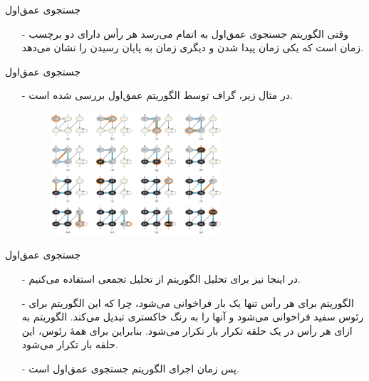 \begin{frame}{‌جستجوی عمق‌اول}
\begin{itemize}\itemr
\item[-]
وقتی الگوریتم جستجوی عمق‌اول به اتمام می‌رسد هر رأس دارای دو برچسب زمان است که یکی زمان پیدا شدن
و دیگری زمان به پایان رسیدن
را نشان می‌دهد.
\end{itemize}
\end{frame}


\begin{frame}{‌جستجوی عمق‌اول}
\begin{itemize}\itemr
\item[-]
در مثال زیر، گراف توسط الگوریتم عمق‌اول بررسی شده است.
\begin{figure}
\includegraphics[width=0.6\textwidth]{figs/chap07/566-dfs}
\end{figure}
\end{itemize}
\end{frame}


\begin{frame}{‌جستجوی عمق‌اول}
\begin{itemize}\itemr
\item[-]
در اینجا نیز برای تحلیل الگوریتم از تحلیل تجمعی استفاده می‌کنیم.
\item[-]
الگوریتم
برای هر رأس
تنها یک بار فراخوانی می‌شود، چرا که این الگوریتم برای رئوس سفید فراخوانی می‌شود و آنها را به رنگ خاکستری تبدیل می‌کند. الگوریتم
به ازای هر رأس
در یک حلقه تکرار
بار تکرار می‌شود. بنابراین برای همهٔ رئوس، این حلقه
بار تکرار می‌شود.
\item[-]
پس زمان اجرای الگوریتم جستجوی عمق‌اول
است.
\end{itemize}
\end{frame}


